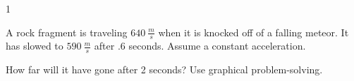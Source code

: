 
\AddToShipoutPicture*{\BackgroundPic}

\addtocounter {ProbNum} {1}

 
{\bf \Large{}} A rock fragment is traveling ${640~\tfrac{m}{s}}$  when it is knocked off of a falling meteor. It has slowed to ${590~\tfrac{m}{s}}$  after .6 seconds.  Assume a constant acceleration. 

\bigskip
How far will it have gone after 2 seconds? Use graphical problem-solving.



\vfill
\newpage
